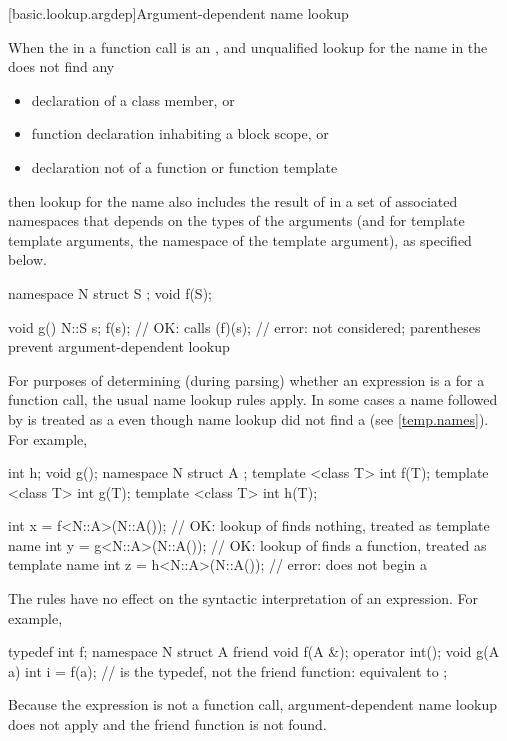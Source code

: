 [basic.lookup.argdep]{Argument-dependent name lookup}%

\pnum
When the  in
a function call is an ,
and unqualified lookup
for the name in the  does not find any
\begin{itemize}
\item
declaration of a class member, or
\item
function declaration inhabiting a block scope, or
\item
declaration not of a function or function template
\end{itemize}
then lookup for the name also includes the result of
 in a set of associated namespaces
that depends on the types of the arguments
(and for template template arguments, the namespace of the template argument),
as specified below.
\begin{example}
\begin{codeblock}
namespace N {
  struct S { };
  void f(S);
}

void g() {
  N::S s;
  f(s);     // OK: calls 
  (f)(s);   // error:  not considered; parentheses prevent argument-dependent lookup
}
\end{codeblock}
\end{example}

\pnum
\begin{note}
For purposes of determining
(during parsing) whether an expression is a
 for a function call, the usual name lookup
rules apply.
In some cases
a name followed by \tcode{<} is treated as a 
even though name lookup did not find a 
(see \ref{temp.names}).
For example,
\begin{codeblock}
int h;
void g();
namespace N {
  struct A {};
  template <class T> int f(T);
  template <class T> int g(T);
  template <class T> int h(T);
}

int x = f<N::A>(N::A());        // OK: lookup of  finds nothing,  treated as template name
int y = g<N::A>(N::A());        // OK: lookup of  finds a function,  treated as template name
int z = h<N::A>(N::A());        // error:  does not begin a 
\end{codeblock}

The rules have no effect on the syntactic interpretation of an expression.
For example,
\begin{codeblock}
typedef int f;
namespace N {
  struct A {
    friend void f(A &);
    operator int();
    void g(A a) {
      int i = f(a);             //  is the typedef, not the friend function: equivalent to 
    }
  };
}
\end{codeblock}
Because the expression is not a function call,
argument-dependent name lookup does not apply and
the friend function  is not found.
\end{note}

